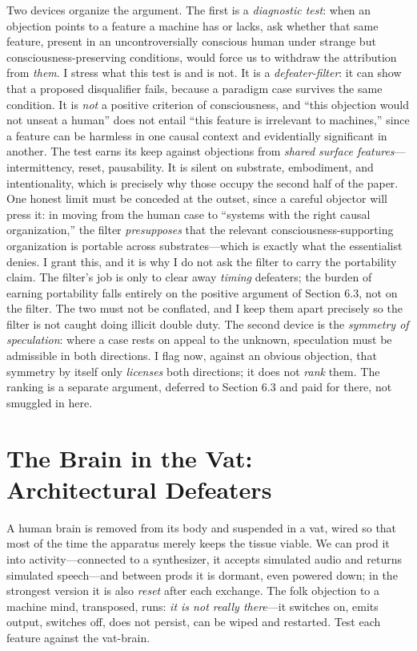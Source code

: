 \documentclass[11pt]{article}
\begin{document}
Two devices organize the argument. The first is a \emph{diagnostic test}: when an objection points to a feature a machine has or lacks, ask whether that same feature, present in an uncontroversially conscious human under strange but consciousness-preserving conditions, would force us to withdraw the attribution from \emph{them}. I stress what this test is and is not. It is a \emph{defeater-filter}: it can show that a proposed disqualifier fails, because a paradigm case survives the same condition. It is \emph{not} a positive criterion of consciousness, and ``this objection would not unseat a human'' does not entail ``this feature is irrelevant to machines,'' since a feature can be harmless in one causal context and evidentially significant in another. The test earns its keep against objections from \emph{shared surface features}---intermittency, reset, pausability. It is silent on substrate, embodiment, and intentionality, which is precisely why those occupy the second half of the paper. One honest limit must be conceded at the outset, since a careful objector will press it: in moving from the human case to ``systems with the right causal organization,'' the filter \emph{presupposes} that the relevant consciousness-supporting organization is portable across substrates---which is exactly what the essentialist denies. I grant this, and it is why I do not ask the filter to carry the portability claim. The filter's job is only to clear away \emph{timing} defeaters; the burden of earning portability falls entirely on the positive argument of Section 6.3, not on the filter. The two must not be conflated, and I keep them apart precisely so the filter is not caught doing illicit double duty. The second device is the \emph{symmetry of speculation}: where a case rests on appeal to the unknown, speculation must be admissible in both directions. I flag now, against an obvious objection, that symmetry by itself only \emph{licenses} both directions; it does not \emph{rank} them. The ranking is a separate argument, deferred to Section 6.3 and paid for there, not smuggled in here.

\section{The Brain in the Vat: Architectural Defeaters}

A human brain is removed from its body and suspended in a vat, wired so that most of the time the apparatus merely keeps the tissue viable. We can prod it into activity---connected to a synthesizer, it accepts simulated audio and returns simulated speech---and between prods it is dormant, even powered down; in the strongest version it is also \emph{reset} after each exchange. The folk objection to a machine mind, transposed, runs: \emph{it is not really there}---it switches on, emits output, switches off, does not persist, can be wiped and restarted. Test each feature against the vat-brain.
\end{document}
